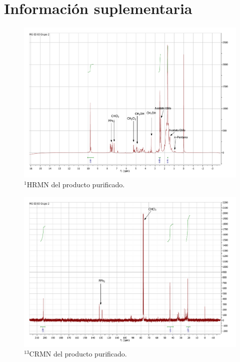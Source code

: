 \documentclass[fleqn,10pt]{SelfArx}
\begin{document}
\section{Informaci\'on suplementaria}\label{sec: complementaria}
\begin{figure}[h]
	\centering
	\includegraphics[width=0.5\textheight]{RMN/H.pdf}
	\caption{$^1$HRMN del producto purificado.}
\end{figure}
\begin{figure}[h]
	\centering
	\includegraphics[width=0.5\textheight]{RMN/C.pdf}
	\caption{$^{13}$CRMN del producto purificado.}
\end{figure}
\end{document}
